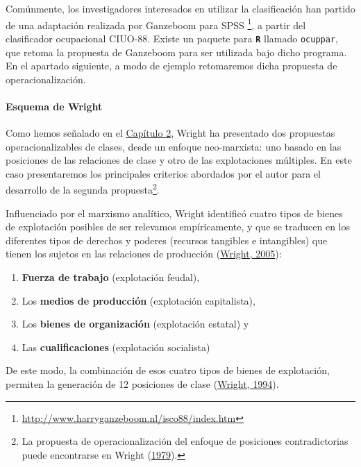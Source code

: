\documentclass[
]{article}
\providecommand{\tightlist}{%
  \setlength{\itemsep}{0pt}\setlength{\parskip}{0pt}}
\begin{document}
Comúnmente, los investigadores interesados en utilizar la clasificación han partido de una adaptación realizada por Ganzeboom para SPSS \footnote{\url{http://www.harryganzeboom.nl/isco88/index.htm}}, a partir del clasificador ocupacional CIUO-88. Existe un paquete para \textbf{\texttt{R}} llamado \texttt{ocuppar}, que retoma la propuesta de Ganzeboom para ser utilizada bajo dicho programa. En el apartado siguiente, a modo de ejemplo retomaremos dicha propuesta de operacionalización.

\hypertarget{esquema-de-wright}{%
\paragraph{Esquema de Wright}\label{esquema-de-wright}}

Como hemos señalado en el \protect\hyperlink{estructura1}{Capítulo 2}, Wright ha presentado dos propuestas operacionalizables de clases, desde un enfoque neo-marxista: uno basado en las posiciones de las relaciones de clase y otro de las explotaciones múltiples. En este caso presentaremos los principales criterios abordados por el autor para el desarrollo de la segunda propuesta\footnote{La propuesta de operacionalización del enfoque de posiciones contradictorias puede encontrarse en Wright (\protect\hyperlink{ref-Wright1979}{1979}).}.

Influenciado por el marxismo analítico, Wright identificó cuatro tipos de bienes de explotación posibles de ser relevamos empíricamente, y que se traducen en los diferentes tipos de derechos y poderes (recursos tangibles e intangibles) que tienen los sujetos en las relaciones de producción (\protect\hyperlink{ref-Wright2005}{Wright, 2005}):

\begin{enumerate}
\def\labelenumi{\arabic{enumi}.}
\tightlist
\item
  \textbf{Fuerza de trabajo} (explotación feudal),\\
\item
  Los \textbf{medios de producción} (explotación capitalista),\\
\item
  Los \textbf{bienes de organización} (explotación estatal) y\\
\item
  Las \textbf{cualificaciones} (explotación socialista)
\end{enumerate}

De este modo, la combinación de esos cuatro tipos de bienes de explotación, permiten la generación de 12 posiciones de clase (\protect\hyperlink{ref-Wright1994b}{Wright, 1994}).
\end{document}
